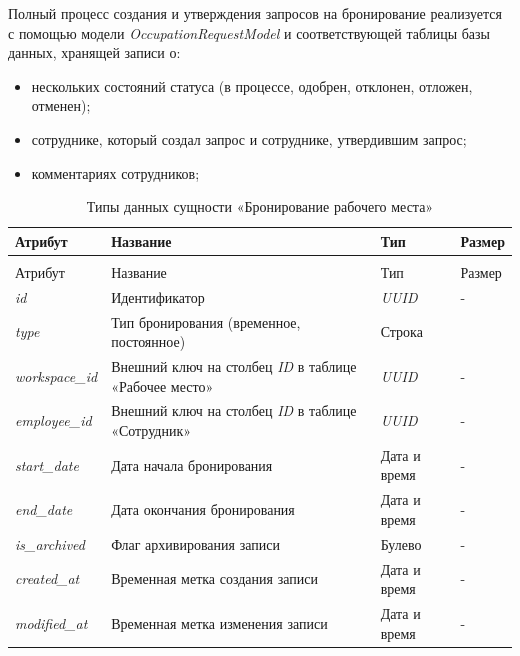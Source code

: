 Полный процесс создания и утверждения запросов на бронирование реализуется с помощью модели \textit{OccupationRequestModel} и соответствующей таблицы базы данных, хранящей записи о:

\begin{itemize}
    \item нескольких состояний статуса (в процессе, одобрен, отклонен, отложен, отменен);
    \item сотруднике, который создал запрос и сотруднике, утвердившим запрос;
    \item комментариях сотрудников;
\end{itemize}

\begingroup
\singlespacing
\vspace{-\baselineskip}
\begin{longtable}{| >{\raggedright}m{} 
                  | >{\raggedright}m{} 
                  | >{\raggedright}m{} 
                  | >{\raggedright\arraybackslash}m{}|}
    \caption{Типы данных сущности «Бронирование рабочего места»} \label{table:system-design:database-model:workspace_occupation-schema} \\ \hline
    Атрибут & Название & Тип & Размер \\ \hline
    \endfirsthead
    \multicolumn{4}{@{}l}{\noindent Продолжение таблицы~\thetable} \\ \hline
    Атрибут & Название & Тип & Размер \\ \hline
    \endhead
    \textit{id} & Идентификатор & \textit{UUID} & - \\ \hline
    \textit{type} & Тип бронирования (временное, постоянное) & Строка & 15 \\ \hline
    \textit{workspace\_id} & Внешний ключ на столбец \textit{ID} в таблице «Рабочее место» & \textit{UUID} & - \\ \hline
    \textit{employee\_id} & Внешний ключ на столбец \textit{ID} в таблице «Сотрудник» & \textit{UUID} & - \\ \hline
    \textit{start\_date} & Дата начала бронирования & Дата и время & - \\ \hline
    \textit{end\_date} & Дата окончания бронирования & Дата и время & - \\ \hline
    \textit{is\_archived} & Флаг архивирования записи & Булево & - \\ \hline
    \textit{created\_at} & Временная метка создания записи & Дата и время & - \\ \hline
    \textit{modified\_at} & Временная метка изменения записи & Дата и время & - \\ \hline
\end{longtable}
\endgroup

